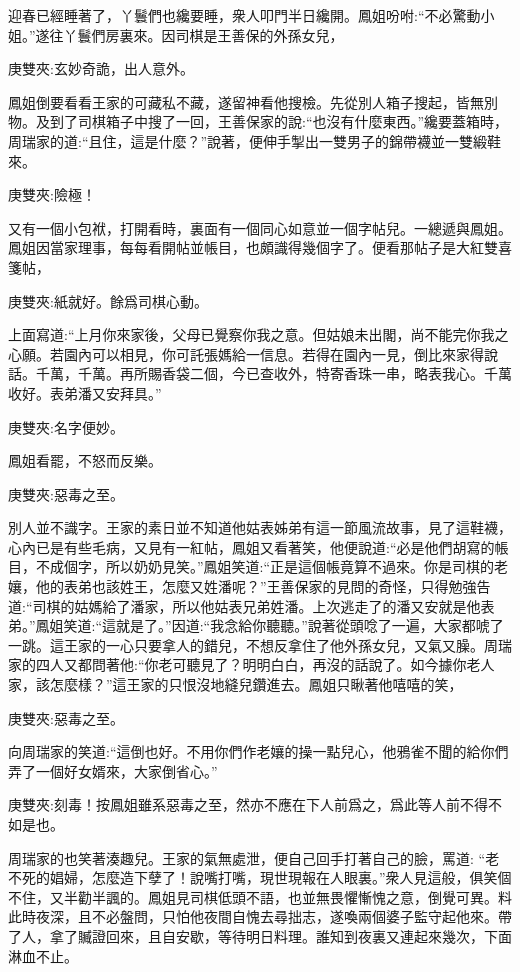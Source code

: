 \begin{parag}
    迎春已經睡著了，丫鬟們也纔要睡，衆人叩門半日纔開。鳳姐吩咐:“不必驚動小姐。”遂往丫鬟們房裏來。因司棋是王善保的外孫女兒，\begin{note}庚雙夾:玄妙奇詭，出人意外。\end{note}鳳姐倒要看看王家的可藏私不藏，遂留神看他搜檢。先從別人箱子搜起，皆無別物。及到了司棋箱子中搜了一回，王善保家的說:“也沒有什麼東西。”纔要蓋箱時，周瑞家的道:“且住，這是什麼？”說著，便伸手掣出一雙男子的錦帶襪並一雙緞鞋來。\begin{note}庚雙夾:險極！\end{note}又有一個小包袱，打開看時，裏面有一個同心如意並一個字帖兒。一總遞與鳳姐。鳳姐因當家理事，每每看開帖並帳目，也頗識得幾個字了。便看那帖子是大紅雙喜箋帖，\begin{note}庚雙夾:紙就好。餘爲司棋心動。\end{note}上面寫道:“上月你來家後，父母已覺察你我之意。但姑娘未出閣，尚不能完你我之心願。若園內可以相見，你可託張媽給一信息。若得在園內一見，倒比來家得說話。千萬，千萬。再所賜香袋二個，今已查收外，特寄香珠一串，略表我心。千萬收好。表弟潘又安拜具。”\begin{note}庚雙夾:名字便妙。\end{note}鳳姐看罷，不怒而反樂。\begin{note}庚雙夾:惡毒之至。\end{note}別人並不識字。王家的素日並不知道他姑表姊弟有這一節風流故事，見了這鞋襪，心內已是有些毛病，又見有一紅帖，鳳姐又看著笑，他便說道:“必是他們胡寫的帳目，不成個字，所以奶奶見笑。”鳳姐笑道:“正是這個帳竟算不過來。你是司棋的老孃，他的表弟也該姓王，怎麼又姓潘呢？”王善保家的見問的奇怪，只得勉強告道:“司棋的姑媽給了潘家，所以他姑表兄弟姓潘。上次逃走了的潘又安就是他表弟。”鳳姐笑道:“這就是了。”因道:“我念給你聽聽。”說著從頭唸了一遍，大家都唬了一跳。這王家的一心只要拿人的錯兒，不想反拿住了他外孫女兒，又氣又臊。周瑞家的四人又都問著他:“你老可聽見了？明明白白，再沒的話說了。如今據你老人家，該怎麼樣？”這王家的只恨沒地縫兒鑽進去。鳳姐只瞅著他嘻嘻的笑，\begin{note}庚雙夾:惡毒之至。\end{note}向周瑞家的笑道:“這倒也好。不用你們作老孃的操一點兒心，他鴉雀不聞的給你們弄了一個好女婿來，大家倒省心。”\begin{note}庚雙夾:刻毒！按鳳姐雖系惡毒之至，然亦不應在下人前爲之，爲此等人前不得不如是也。\end{note}周瑞家的也笑著湊趣兒。王家的氣無處泄，便自己回手打著自己的臉，罵道: “老不死的娼婦，怎麼造下孽了！說嘴打嘴，現世現報在人眼裏。”衆人見這般，俱笑個不住，又半勸半諷的。鳳姐見司棋低頭不語，也並無畏懼慚愧之意，倒覺可異。料此時夜深，且不必盤問，只怕他夜間自愧去尋拙志，遂喚兩個婆子監守起他來。帶了人，拿了贓證回來，且自安歇，等待明日料理。誰知到夜裏又連起來幾次，下面淋血不止。
\end{parag}


